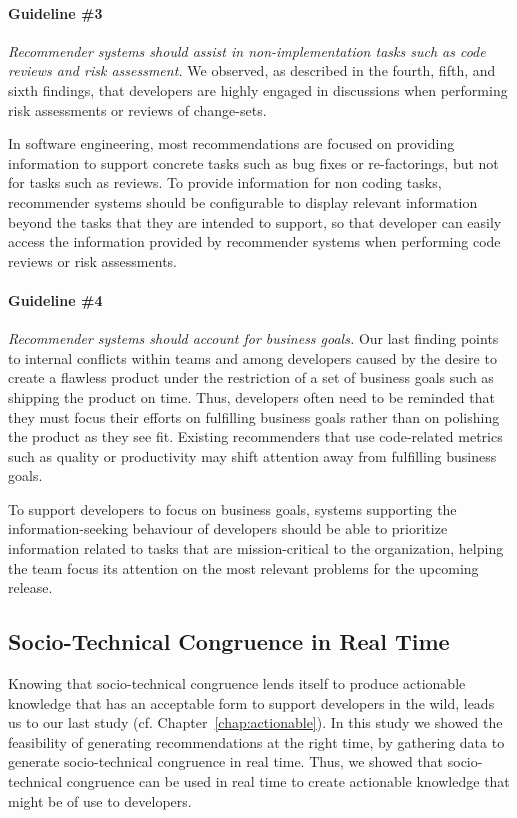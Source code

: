 \paragraph{Guideline \#3} \emph{Recommender systems should assist in non-implementation tasks such as code reviews and risk assessment.} 
We observed, as described in the fourth, fifth, and sixth findings, that developers are highly engaged in discussions when performing risk assessments or reviews of change-sets. 

In software engineering, most recommendations are focused on providing information to support concrete tasks such as bug fixes or re-factorings, but not for tasks such as reviews. To provide information for non coding tasks, recommender systems should be configurable to display relevant information beyond the tasks that they are intended to support, so that developer can easily access the information provided by recommender systems when performing code reviews or risk assessments.

\paragraph{Guideline \#4} \emph{Recommender systems should account for business goals.}
Our last finding points to internal conflicts within teams and among developers caused by the desire to create a flawless product under the restriction of a set of business goals such as shipping the product on time.
Thus, developers often need to be reminded that they must focus their efforts on fulfilling business goals rather than on polishing the product as they see fit. Existing recommenders that use code-related metrics such as quality or productivity may shift attention away from fulfilling business goals.

To support developers to focus on business goals, systems supporting the information-seeking behaviour of developers should be able to prioritize information related to tasks that are mission-critical to the organization, helping the team focus its attention on the most relevant problems for the upcoming release.


\subsection{Socio-Technical Congruence in Real Time}
Knowing that socio-technical congruence lends itself to produce actionable knowledge that has an acceptable form to support developers in the wild, leads us to our last study (cf. Chapter~\ref{chap:actionable}).
In this study we showed the feasibility of generating recommendations at the right time, by gathering data to generate socio-technical congruence in real time.
Thus, we showed that socio-technical congruence can be used in real time to create actionable knowledge that might be of use to developers.


